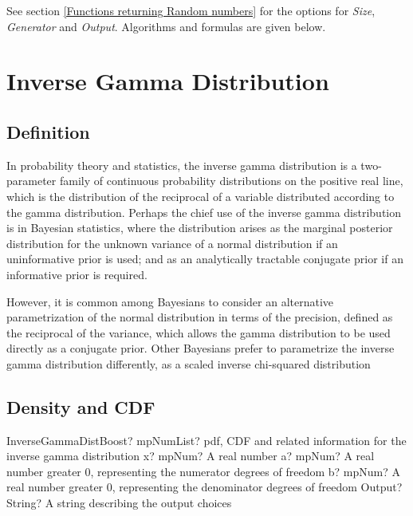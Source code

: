 \vspace{0.3cm}
See section \ref{Functions returning Random numbers} for the options for  {\itshape\sffamily Size},  {\itshape\sffamily Generator} and {\itshape\sffamily Output}. Algorithms and formulas are given below.



\newpage
\section{Inverse Gamma Distribution}


\subsection{Definition}
\label{InverseGammaDistributionDefinition}

In probability theory and statistics, the inverse gamma distribution is a two-parameter family of continuous probability distributions on the positive real line, which is the distribution of the reciprocal of a variable distributed according to the gamma distribution. Perhaps the chief use of the inverse gamma distribution is in Bayesian statistics, where the distribution arises as the marginal posterior distribution for the unknown variance of a normal distribution if an uninformative prior is used; and as an analytically tractable conjugate prior if an informative prior is required.

However, it is common among Bayesians to consider an alternative parametrization of the normal distribution in terms of the precision, defined as the reciprocal of the variance, which allows the gamma distribution to be used directly as a conjugate prior. Other Bayesians prefer to parametrize the inverse gamma distribution differently, as a scaled inverse chi-squared distribution



\subsection{Density and CDF}

\begin{mpFunctionsExtract}
	\mpFunctionFourNotImplemented
	{InverseGammaDistBoost? mpNumList? pdf, CDF and related information for the inverse gamma distribution}
	{x? mpNum? A real number}
	{a? mpNum? A real number greater 0, representing the numerator  degrees of freedom}
	{b? mpNum? A real number greater 0, representing the denominator degrees of freedom}
	{Output? String? A string describing the output choices}
\end{mpFunctionsExtract}


